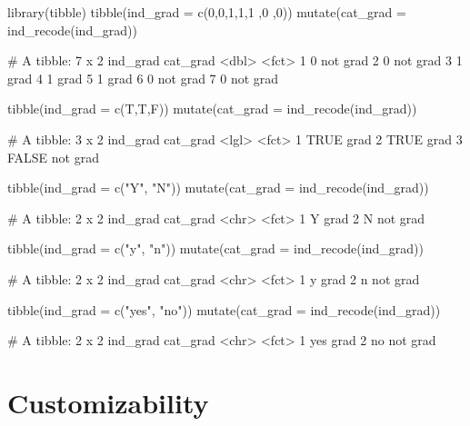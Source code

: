 \begin{Schunk}
\begin{Sinput}
library(tibble)
tibble(ind_grad = c(0,0,1,1,1 ,0 ,0)) %
  mutate(cat_grad  = ind_recode(ind_grad))
\end{Sinput}
\begin{Soutput}
     # A tibble: 7 x 2
       ind_grad cat_grad
          <dbl> <fct>   
     1        0 not grad
     2        0 not grad
     3        1 grad    
     4        1 grad    
     5        1 grad    
     6        0 not grad
     7        0 not grad
\end{Soutput}
\begin{Sinput}
tibble(ind_grad = c(T,T,F)) %
  mutate(cat_grad  = ind_recode(ind_grad))
\end{Sinput}
\begin{Soutput}
     # A tibble: 3 x 2
       ind_grad cat_grad
       <lgl>    <fct>   
     1 TRUE     grad    
     2 TRUE     grad    
     3 FALSE    not grad
\end{Soutput}
\begin{Sinput}
tibble(ind_grad = c("Y", "N")) %
  mutate(cat_grad  = ind_recode(ind_grad))
\end{Sinput}
\begin{Soutput}
     # A tibble: 2 x 2
       ind_grad cat_grad
       <chr>    <fct>   
     1 Y        grad    
     2 N        not grad
\end{Soutput}
\begin{Sinput}
tibble(ind_grad = c("y", "n")) %
  mutate(cat_grad  = ind_recode(ind_grad))
\end{Sinput}
\begin{Soutput}
     # A tibble: 2 x 2
       ind_grad cat_grad
       <chr>    <fct>   
     1 y        grad    
     2 n        not grad
\end{Soutput}
\begin{Sinput}
tibble(ind_grad = c("yes", "no")) %
  mutate(cat_grad  = ind_recode(ind_grad))
\end{Sinput}
\begin{Soutput}
     # A tibble: 2 x 2
       ind_grad cat_grad
       <chr>    <fct>   
     1 yes      grad    
     2 no       not grad
\end{Soutput}
\end{Schunk}

\hypertarget{customizability}{%
\section{Customizability}\label{customizability}}

